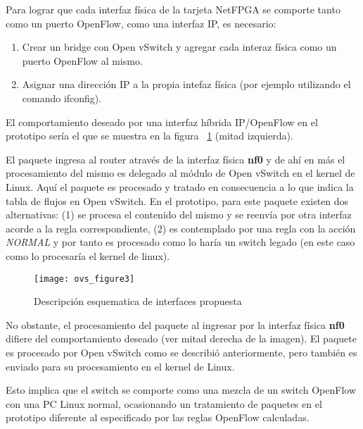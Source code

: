\begin{enumerate}
Para lograr que cada interfaz f\'isica de la tarjeta NetFPGA se comporte tanto como un puerto OpenFlow, como una interfaz IP, es necesario:

\begin{enumerate}
\item Crear un bridge con Open vSwitch y agregar cada interaz f\'isica como un puerto OpenFlow al mismo.
\item Asignar una dirección IP a la propia intefaz f\'isica (por ejemplo utilizando el comando ifconfig).
\end{enumerate}


El comportamiento deseado por una interfaz h\'ibrida IP/OpenFlow en el prototipo ser\'ia el que se muestra en la figura ~\ref{fig:OVSInterfaces} (mitad izquierda).

El paquete ingresa al router atrav\'es de la interfaz f\'isica \textbf{nf0} y de ah\'i en m\'as el procesamiento del mismo es delegado al m\'odulo de Open vSwitch en el kernel de Linux. Aqu\'i el paquete es procesado y tratado en consecuencia a lo que indica la tabla de flujos en Open vSwitch. En el prototipo, para este paquete existen dos alternativas: (1) se procesa el contenido del mismo y se reenv\'ia por otra interfaz acorde a la regla correspondiente, (2) es contemplado por una regla con la acci\'on \textit{NORMAL} y por tanto es procesado como lo har\'ia un switch legado (en este caso como lo procesar\'ia el kernel de linux).\\

\begin{figure}[h!] 
\centering    
\texttt{[image: ovs\_figure3]}
\caption[OVSInterfaces]{Descripci\'on esquematica de interfaces propuesta}
\label{fig:OVSInterfaces}
\end{figure}

No obstante, el procesamiento del paquete al ingresar por la interfaz f\'isica \textbf{nf0} difiere del comportamiento deseado (ver mitad derecha de la imagen). El paquete es procesado por Open vSwitch como se describi\'o anteriormente, pero tambi\'en es enviado para su procesamiento en el kernel de Linux.

Esto implica que el switch se comporte como una mezcla de un switch OpenFlow  con una PC Linux normal, ocasionando un tratamiento de paquetes en el prototipo diferente al especificado por las reglas OpenFlow calculadas.\\


\end{enumerate}
